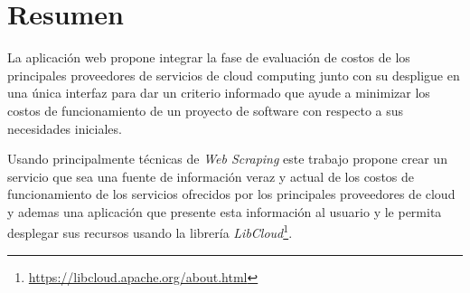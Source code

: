 

\begingroup
\let\clearpage\relax
\let\cleardoublepage\relax
\let\cleardoublepage\relax




\chapter*{Resumen}
La aplicación web \appName propone integrar la fase de evaluación de costos de los principales proveedores de servicios de cloud computing junto con su despligue en una única interfaz para dar un criterio informado que ayude a minimizar los costos de funcionamiento de un proyecto de software con respecto a sus necesidades iniciales.\bigskip

Usando principalmente técnicas de \textit{Web Scraping} este trabajo propone crear un servicio que sea una fuente de información veraz y actual de los costos de funcionamiento de los servicios ofrecidos por los principales proveedores de cloud y ademas una aplicación que presente esta información al usuario y le permita desplegar sus recursos usando la librería \textit{LibCloud}\footnote{\url{https://libcloud.apache.org/about.html}}.
\endgroup			

\vfill